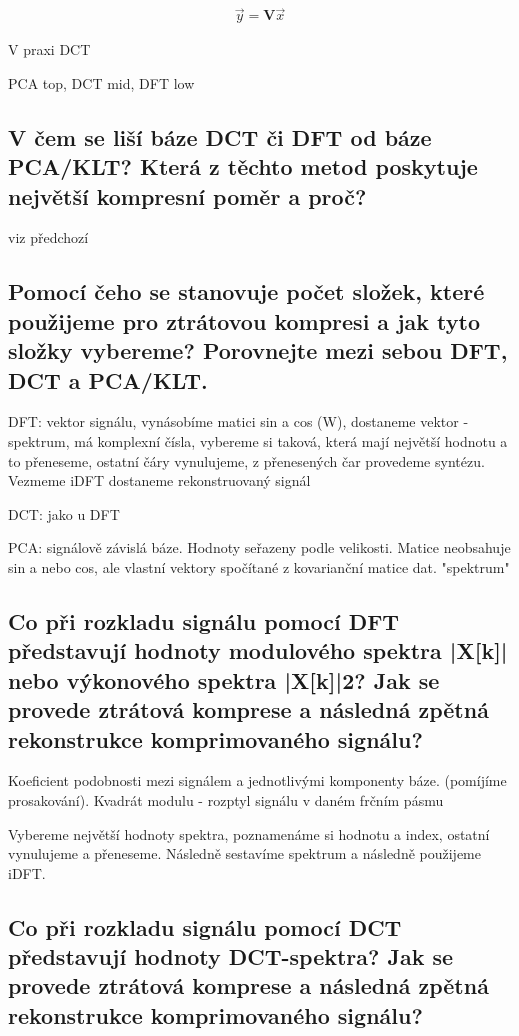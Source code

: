 \documentclass[a4paper,12pt]{article}   %
\begin{document}
\begin{align*}
        \vec{y} = \pmb V \vec{x}
\end{align*}

V praxi DCT

PCA top, DCT mid, DFT low

\subsection{V čem se liší báze DCT či DFT od báze PCA/KLT? Která z těchto metod poskytuje největší kompresní poměr a proč?}
viz předchozí

\subsection{Pomocí čeho se stanovuje počet složek, které použijeme pro ztrátovou kompresi a jak tyto složky vybereme? Porovnejte mezi sebou DFT, DCT a PCA/KLT.}
DFT: vektor signálu, vynásobíme matici sin a cos (W), dostaneme vektor - spektrum, má komplexní čísla, vybereme si taková, která mají největší hodnotu a to přeneseme, ostatní čáry vynulujeme, z přenesených čar provedeme syntézu. Vezmeme iDFT dostaneme rekonstruovaný signál

DCT: jako u DFT

PCA: signálově závislá báze. Hodnoty seřazeny podle velikosti. Matice neobsahuje sin a nebo cos, ale vlastní vektory spočítané z kovarianční matice dat. "spektrum"


\subsection{Co při rozkladu signálu pomocí DFT představují hodnoty modulového spektra |X[k]| nebo výkonového spektra |X[k]|2? Jak se provede ztrátová komprese a následná zpětná rekonstrukce komprimovaného signálu?}

Koeficient podobnosti mezi signálem a jednotlivými komponenty báze. (pomíjíme prosakování). Kvadrát modulu - rozptyl signálu v daném frčním pásmu

Vybereme největší hodnoty spektra, poznamenáme si hodnotu a index, ostatní vynulujeme a přeneseme. Následně sestavíme spektrum a následně použijeme iDFT.

\subsection{Co při rozkladu signálu pomocí DCT představují hodnoty DCT-spektra? Jak se provede ztrátová komprese a následná zpětná rekonstrukce komprimovaného signálu?}
\end{document}
